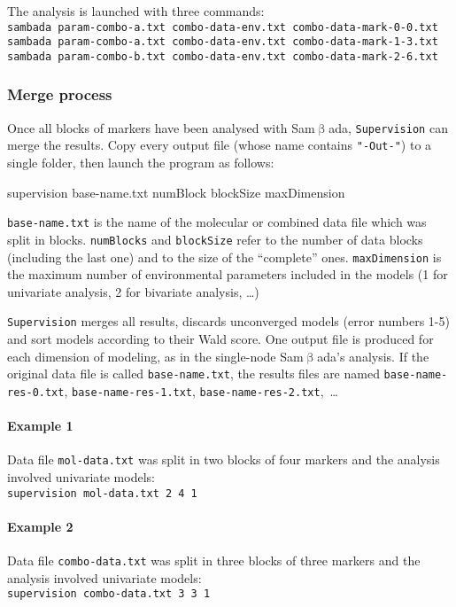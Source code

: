 \documentclass[a4paper,11pt]{article}
\newcommand{\smb}{\textsf{Sam$\upbeta$ada}}
\newcommand{\prog}[1]{\texttt{#1}}
\newenvironment{launch}{\begin{mdframed}\ttfamily}{\end{mdframed}}
\begin{document}
The analysis is launched with three commands:\\
\verb+sambada param-combo-a.txt combo-data-env.txt combo-data-mark-0-0.txt+\\
\verb+sambada param-combo-a.txt combo-data-env.txt combo-data-mark-1-3.txt +\\
\verb+sambada param-combo-b.txt combo-data-env.txt combo-data-mark-2-6.txt+\\


\subsubsection{Merge process}
Once all blocks of markers have been analysed with \smb, \prog{Supervision} can merge the results.
Copy every output file (whose name contains \prog{"-Out-"}) to a single folder, then launch the program as follows:
\begin{launch}
supervision base-name.txt numBlock blockSize maxDimension
\end{launch}
\verb+base-name.txt+ is the name of the molecular or combined data file which was split in blocks.
\verb+numBlocks+ and \verb+blockSize+ refer to the number of data blocks (including the last one) and to the size of the \enquote{complete} ones.
\verb+maxDimension+ is the maximum number of environmental parameters included in the models (1 for univariate analysis, 2 for bivariate analysis, \dots)

\prog{Supervision} merges all results, discards unconverged models (error numbers 1-5) and sort models according to their Wald score.
One output file is produced for each dimension of modeling, as in the single-node \smb's analysis.
If the original data file is called \verb+base-name.txt+, the results files are named \verb+base-name-res-0.txt+, \verb+base-name-res-1.txt+, \verb+base-name-res-2.txt+,~\dots

\paragraph{Example 1}
Data file \verb+mol-data.txt+ was split in two blocks of four markers and the analysis involved univariate models:\\
 \verb+supervision mol-data.txt 2 4 1+\\

\paragraph{Example 2}
Data file \verb+combo-data.txt+ was split in three blocks of three markers and the analysis involved univariate models:\\
 \verb+supervision combo-data.txt 3 3 1+\\
 
\end{document}
